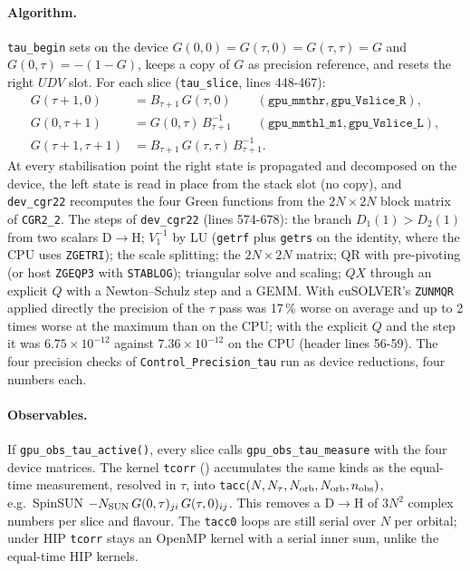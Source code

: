 \paragraph{Algorithm.} \texttt{tau\_begin} sets on the device $G(0,0)=G(\tau,0)=G(\tau,\tau)=G$ and $G(0,\tau)=-(1-G)$, keeps a copy of $G$ as precision reference, and resets the right $UDV$ slot. For each slice (\texttt{tau\_slice}, lines 448-467):
\begin{align}
G(\tau{+}1,0) &= B_{\tau+1}\,G(\tau,0) \qquad(\texttt{gpu\_mmthr}, \texttt{gpu\_Vslice\_R}),\\
G(0,\tau{+}1) &= G(0,\tau)\,B_{\tau+1}^{-1}\qquad(\texttt{gpu\_mmthl\_m1}, \texttt{gpu\_Vslice\_L}),\\
G(\tau{+}1,\tau{+}1) &= B_{\tau+1}\,G(\tau,\tau)\,B_{\tau+1}^{-1}.
\end{align}
At every stabilisation point the right state is propagated and decomposed on the device, the left state is read in place from the stack slot (no copy), and \texttt{dev\_cgr22} recomputes the four Green functions from the $2N\times2N$ block matrix of \texttt{CGR2\_2}. The steps of \texttt{dev\_cgr22} (lines 574-678): the branch $D_1(1)>D_2(1)$ from two scalars D$\to$H; $V_1^{-1}$ by LU (\texttt{getrf} plus \texttt{getrs} on the identity, where the CPU uses \texttt{ZGETRI}); the scale splitting; the $2N\times2N$ matrix; QR with pre-pivoting (or host \texttt{ZGEQP3} with \texttt{STABLOG}); triangular solve and scaling; $QX$ through an explicit $Q$ with a Newton--Schulz step and a GEMM. With cuSOLVER's \texttt{ZUNMQR} applied directly the precision of the $\tau$ pass was 17\,\% worse on average and up to 2 times worse at the maximum than on the CPU; with the explicit $Q$ and the step it was $6.75\times10^{-12}$ against $7.36\times10^{-12}$ on the CPU (header lines 56-59). %
The four precision checks of \texttt{Control\_Precision\_tau} run as device reductions, four numbers each.

\paragraph{Observables.} If \texttt{gpu\_obs\_tau\_active()}, every slice calls \texttt{gpu\_obs\_tau\_measure} with the four device matrices. The kernel \texttt{tcorr} () accumulates the same kinds as the equal-time measurement, resolved in $\tau$, into \texttt{tacc}$(N,N_\tau,N_{\rm orb},N_{\rm orb},n_{\rm obs})$, e.g.\ SpinSUN $-N_{\rm SUN}\,G(0,\tau)_{ji}\,G(\tau,0)_{ij}$. This removes a D$\to$H of $3N^2$ complex numbers per slice and flavour. The \texttt{tacc0} loops are still serial over $N$ per orbital; under HIP \texttt{tcorr} stays an OpenMP kernel with a serial inner sum, unlike the equal-time HIP kernels.

